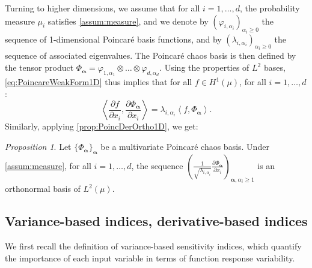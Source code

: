 \documentclass[a4paper,11pt]{article}
\newcommand{\ve}[1]{\boldsymbol{#1}}
\newcommand{\innprod}[2]{\left\langle #1, #2 \right\rangle}
\newcommand{\alp}{{\ve{\alpha}}}
\newcommand{\Phal}{\Phi_{\alp}}
\newcommand{\vpali}[1]{\varphi_{#1, \alpha_{#1}}}
\newcommand{\eig}[1]{\lambda_{#1, \alpha_{#1}}}
\theoremstyle{definition}
\theoremstyle{remark}
\theoremstyle{theorem}
\newtheorem{prop}{Proposition}
\begin{document}
Turning to higher dimensions, we assume that for all $i=1, \dots, d$, the probability measure $\mu_i$ satisfies \cref{assum:measure}, and we denote by $(\vpali{i})_{\alpha_i \geq 0}$ the sequence of 1-dimensional Poincar\'e basis functions, and by $(\lambda_{i, \alpha_i})_{\alpha_i \geq 0}$ the sequence of associated eigenvalues. The Poincar\'e chaos basis is then defined by the tensor product $\Phal = \vpali{1} \otimes \dots \otimes \vpali{d}$. Using the properties of $L^2$ bases, \eqref{eq:PoincareWeakForm1D} thus implies that for all $f \in H^1(\mu)$, for all $i = 1, \dots, d$:
\begin{equation} \label{eq:PoincareWeakForm}
\innprod{\frac{\partial f}{\partial x_i}}{\frac{\partial \Phal}{\partial x_i}} = \lambda_{i, \alpha_i} \innprod{f}{\Phal}.
\end{equation}
Similarly, applying \cref{prop:PoincDerOrtho1D}, we get:
\begin{prop} \label{prop:PoincDerOrtho}
	Let $\{\Phal\}_{\alp}$ be a multivariate Poincar\'e chaos basis.
	Under \cref{assum:measure}, for all $i=1, \dots, d$, the sequence $\displaystyle \left( \frac{1}{\sqrt{\eig{i}}}\frac{\partial \Phal}{\partial x_i} \right)_{\alp, \alpha_i \geq 1}$ is an orthonormal basis of $L^2(\mu)$. 
\end{prop}


\subsection{Variance-based indices, derivative-based indices}
We first recall the definition of variance-based sensitivity indices, which quantify the importance of each input variable in terms of function response variability.
\end{document}

